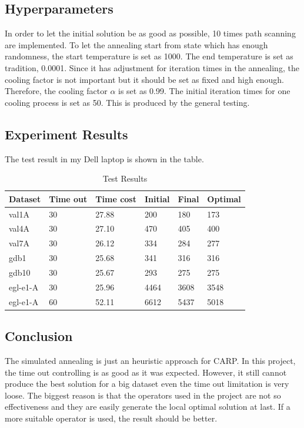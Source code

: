 \documentclass[9pt,shortpaper,twoside,web]{ieeecolor}
\begin{document}
\subsection{Hyperparameters}
In order to let the initial solution be as good as possible, 10 times path scanning are implemented. To let the annealing start from state which has enough randomness, the start temperature is set as 1000. The end temperature is set as tradition, 0.0001. Since it has adjustment for iteration times in the annealing, the cooling factor is not important but it should be set as fixed and high enough. Therefore, the cooling factor $\alpha$ is set as 0.99. The initial iteration times for one cooling process is set as 50. This is produced by the general testing.

\subsection{Experiment Results}
The test result in my Dell laptop is shown in the table.
\begin{table}[ht]
\caption{Test Results}
\label{table}
\centering
\begin{tabular}{|l|l|l|l|l|l|}
\hline
Dataset & Time out & Time cost & Initial & Final & Optimal \\ \hline
val1A & 30 & 27.88 & 200 & 180 & 173 \\ \hline
val4A & 30 & 27.10 & 470 & 405 & 400 \\ \hline
val7A & 30 & 26.12 & 334 & 284 & 277 \\ \hline
gdb1 & 30 & 25.68 & 341 & 316 & 316 \\ \hline
gdb10 & 30 & 25.67 & 293 & 275 & 275 \\ \hline
egl-e1-A & 30 & 25.96 & 4464 & 3608 & 3548 \\ \hline
egl-e1-A & 60 & 52.11 & 6612 & 5437 & 5018 \\ \hline
\end{tabular}
\end{table}

\subsection{Conclusion}
The simulated annealing is just an heuristic approach for CARP. In this project, the time out controlling is as good as it was expected. However, it still cannot produce the best solution for a big dataset even the time out limitation is very loose. The biggest reason is that the operators used in the project are not so effectiveness and they are easily generate the local optimal solution at last. If a more suitable operator is used, the result should be better.
\end{document}
